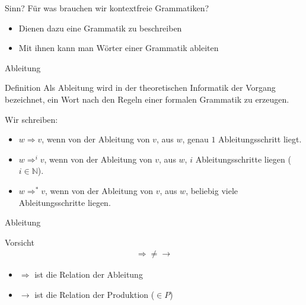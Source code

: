 	\begin{frame}{Sinn?}
		Für was brauchen wir kontextfreie Grammatiken?		
		\begin{itemize}
			\pause
			\item Dienen dazu eine Grammatik zu beschreiben
			
			\pause
			\item Mit ihnen kann man Wörter einer Grammatik ableiten
		\end{itemize}
	\end{frame}
	
	
	\begin{frame}{Ableitung}
    	\begin{block}{Definition}
        	Als Ableitung wird in der theoretischen Informatik der Vorgang 
        	bezeichnet, ein Wort nach den Regeln einer formalen 
        	Grammatik zu erzeugen.
   		\end{block}
   		
    	
    	Wir schreiben: \pause
    	\begin{itemize}
        	\item $w \Rightarrow v$, wenn von der Ableitung von $v$, aus $w$, 
        	genau $1$ Ableitungsschritt liegt.
        	
        	\pause
        	\item $w \Rightarrow^i v$, wenn von der Ableitung von $v$, aus $w$, 
        	$i$ Ableitungsschritte liegen ($i \in \mathbb{N}$).
        	
        	\pause
        	\item $w \Rightarrow^* v$, wenn von der Ableitung von $v$, aus $w$, 
        	beliebig viele Ableitungsschritte liegen.
    	\end{itemize}
	\end{frame}
	
	
	\begin{frame}{Ableitung}
    	\begin{alertblock}{Vorsicht}
        	\begin{align*}
            \Rightarrow \neq \rightarrow
        	\end{align*}
        	
        	\begin{itemize}
        		\item $\Rightarrow$ ist die Relation der Ableitung
       	    	\item $\rightarrow$ ist die Relation der Produktion ($\in P$)
			\end{itemize}
		\end{alertblock}
	\end{frame}

